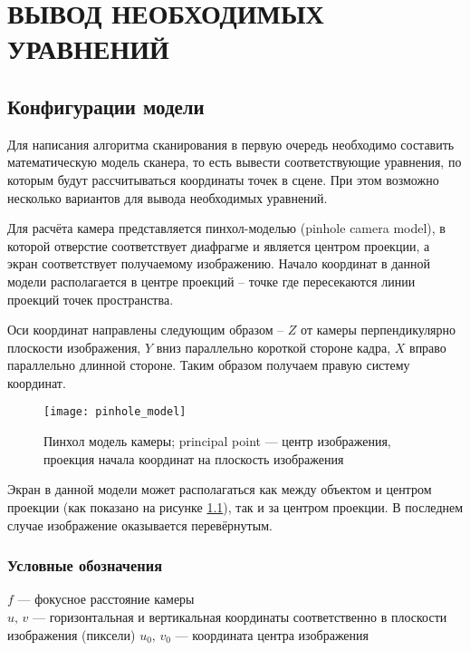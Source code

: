 \chapter{ВЫВОД НЕОБХОДИМЫХ УРАВНЕНИЙ}
    \section{Конфигурации модели}
        Для написания алгоритма сканирования в первую очередь необходимо составить математическую модель сканера, то есть вывести соответствующие уравнения, по которым будут рассчитываться координаты точек в сцене. При этом возможно несколько вариантов для вывода необходимых уравнений.
        
        Для расчёта камера представляется пинхол-моделью (pinhole camera model), в которой отверстие соответствует диафрагме и является центром проекции, а экран соответствует получаемому изображению. Начало координат в данной модели располагается в центре проекций -- точке где пересекаются линии проекций точек пространства.
        
        Оси координат направлены следующим образом -- $ Z $ от камеры перпендикулярно плоскости изображения, $ Y $ вниз параллельно короткой стороне кадра, $ X $ вправо параллельно длинной стороне. Таким образом получаем правую систему координат.
        
        \begin{figure}[H]
            \centering
            \texttt{[image: pinhole\_model]}
            \caption{Пинхол модель камеры; principal point --- центр изображения, проекция начала координат на плоскость изображения}\label{pic:pinhole_model}
        \end{figure}

        Экран в данной модели может располагаться как между объектом и центром проекции (как показано на рисунке \ref{pic:pinhole_model}), так и за центром проекции. В последнем случае изображение оказывается перевёрнутым.

        \subsection{Условные обозначения}
            $ f $ --- фокусное расстояние камеры\\
            $ u,\,v $ --- горизонтальная и вертикальная координаты соответственно в плоскости изображения (пиксели) 
            $ u_0,\,v_0 $ --- координата центра изображения
            
